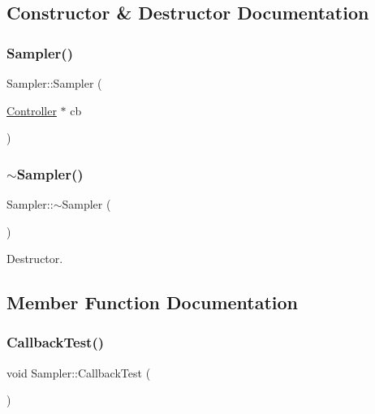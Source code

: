 \subsection{Constructor \& Destructor Documentation}
\mbox{\label{classSampler_aec4905ed5f8259bb5e361da172bf7f17}} 
\subsubsection{\texorpdfstring{Sampler()}{Sampler()}}
{\footnotesize\ttfamily Sampler\+::\+Sampler (\begin{DoxyParamCaption}\item[{\hyperlink{classController}{Controller} $\ast$}]{cb }\end{DoxyParamCaption})\hspace{0.3cm}{\ttfamily [inline]}}

\mbox{\label{classSampler_afbbbd238b78dd3024686c852b69fa64e}} 
\subsubsection{\texorpdfstring{$\sim$\+Sampler()}{~Sampler()}}
{\footnotesize\ttfamily Sampler\+::$\sim$\+Sampler (\begin{DoxyParamCaption}{ }\end{DoxyParamCaption})\hspace{0.3cm}{\ttfamily [inline]}}



Destructor. 



\subsection{Member Function Documentation}
\mbox{\label{classSampler_a4e239960ef9947af152ba441ba152cd0}} 
\subsubsection{\texorpdfstring{Callback\+Test()}{CallbackTest()}}
{\footnotesize\ttfamily void Sampler\+::\+Callback\+Test (\begin{DoxyParamCaption}{ }\end{DoxyParamCaption})}

